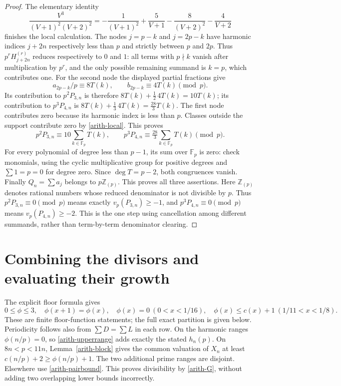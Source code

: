 \documentclass[11pt]{article}
\newcommand{\Z}{\mathbb Z}
\newcommand{\Fp}{\mathbb F_p}
\begin{document}
\begin{proof}
The elementary identity
\[
 \frac{V^3}{(V+1)^2(V+2)^2}
 =-\frac1{(V+1)^2}+\frac5{V+1}
  -\frac8{(V+2)^2}-\frac4{V+2}
\]
finishes the local calculation. The nodes $j=p-k$ and $j=2p-k$ have
harmonic indices $j+2n$ respectively less than $p$ and strictly between
$p$ and $2p$. Thus $p^rH_{j+2n}^{(r)}$ reduces respectively to $0$ and
$1$: all terms with $p\nmid k$ vanish after multiplication by $p^r$,
and the only possible remaining summand is $k=p$, which contributes one.
For the second node the displayed partial fractions give
\[
 a_{2p-k}/p\equiv8T(k),\qquad b_{2p-k}\equiv4T(k)\pmod p.
\]
Its contribution to $p^2P_{3,n}$ is therefore
$8T(k)+\tfrac12\,4T(k)=10T(k)$; its contribution to $p^3P_{4,n}$
is $8T(k)+\tfrac13\,4T(k)=\tfrac{28}3T(k)$.
The first node contributes zero because its harmonic index is less than
$p$. Classes outside the support contribute zero by \eqref{arith-local}.
This proves
\[
 p^2P_{3,n}\equiv10\sum_{k\in\Fp}T(k),\qquad
 p^3P_{4,n}\equiv\tfrac{28}{3}\sum_{k\in\Fp}T(k)\pmod p.
\]
For every polynomial of degree less than $p-1$, its sum over $\Fp$
is zero: check monomials, using the cyclic multiplicative group for
positive degrees and $\sum1=p=0$ for degree zero.
Since $\deg T=p-2$, both congruences vanish. Finally $Q_n=\sum a_j$
belongs to $p\Z_{(p)}$. This proves all three assertions.
Here $\Z_{(p)}$ denotes rational numbers whose reduced denominator is
not divisible by $p$. Thus $p^2P_{3,n}\equiv0\pmod p$ means exactly
$v_p(P_{3,n})\geq-1$, and $p^3P_{4,n}\equiv0\pmod p$ means
$v_p(P_{4,n})\geq-2$. This is the one step using cancellation among
different summands, rather than term-by-term denominator clearing.
\end{proof}

\section{Combining the divisors and evaluating their growth}
The explicit floor formula gives
\begin{equation}\label{arith-profilefacts}
0\leq\phi\leq3,\quad \phi(x+1)=\phi(x),\quad
\phi(x)=0\ (0<x<1/16),\quad
\phi(x)\leq c(x)+1\ (1/11<x<1/8).
\end{equation}
These are finite floor-function statements; the full exact partition is
given below. Periodicity follows also from $\sum D=\sum L$ in each row.
On the harmonic ranges $\phi(n/p)=0$, so \eqref{arith-upperrange} adds exactly
the stated $h_n(p)$. On $8n<p<11n$, Lemma~\ref{arith-block} gives the common
valuation of $X_n$ at least $c(n/p)+2\geq\phi(n/p)+1$.
The two additional prime ranges are disjoint. Elsewhere use
\eqref{arith-pairbound}. This proves divisibility by \eqref{arith-G}, without adding
two overlapping lower bounds incorrectly.
\end{document}
